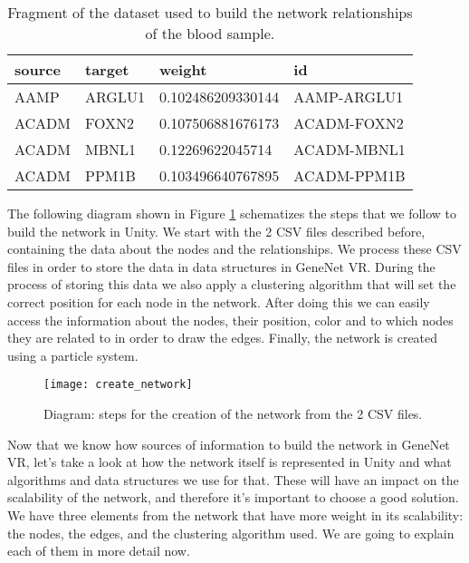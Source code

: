 \begin{table}[h!]
\centering
\begin{tabular}{llll}
\hline
source & target & weight            & id          \\
\hline
AAMP   & ARGLU1 & 0.102486209330144 & AAMP-ARGLU1 \\
ACADM  & FOXN2  & 0.107506881676173 & ACADM-FOXN2 \\
ACADM  & MBNL1  & 0.12269622045714  & ACADM-MBNL1 \\
ACADM  & PPM1B  & 0.103496640767895 & ACADM-PPM1B \\
\end{tabular}
\caption{Fragment of the dataset used to build the network relationships of the blood sample.}
\label{tab:network-data}
\end{table}

The following diagram shown in Figure \ref{fig:create_network} schematizes the steps that we follow to build the network in Unity. We start with the 2 CSV files described before, containing the data about the nodes and the relationships. We process these CSV files in order to store the data in data structures in GeneNet VR. During the process of storing this data we also apply a clustering algorithm that will set the correct position for each node in the network. After doing this we can easily access the information about the nodes, their position, color and to which nodes they are related to in order to draw the edges. Finally, the network is created using a particle system.

\begin{figure}[h!]
    \centering%
    \texttt{[image: create\_network]}
    \caption{Diagram: steps for the creation of the network from the 2 CSV files.}
    \label{fig:create_network}
\end{figure}%

Now that we know how sources of information to build the network in GeneNet VR, let's take a look at how the network itself is represented in Unity and what algorithms and data structures we use for that. These will have an impact on the scalability of the network, and therefore it's important to choose a good solution. We have three elements from the network that have more weight in its scalability: the nodes, the edges, and the clustering algorithm used. We are going to explain each of them in more detail now.

